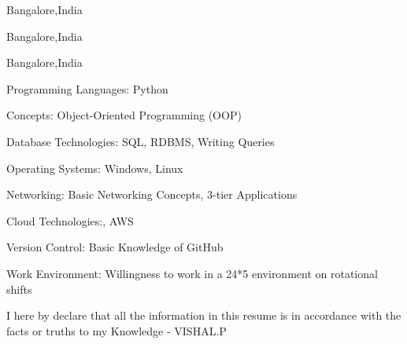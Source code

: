 

 {Bangalore,India}
\divider

 {Bangalore,India}
\divider

 {Bangalore,India}




{}



\item Programming Languages: Python
\item Concepts: Object-Oriented Programming (OOP)
\item Database Technologies: SQL, RDBMS, Writing Queries
\item Operating Systems: Windows, Linux
\item Networking: Basic Networking Concepts, 3-tier Applications
\item Cloud Technologies:, AWS
\item Version Control: Basic Knowledge of GitHub
\item Work Environment: Willingness to work in a 24*5 environment on rotational shifts






\item{I here by declare that all the information in this resume is in accordance with the facts or truths to my Knowledge - VISHAL.P
}









